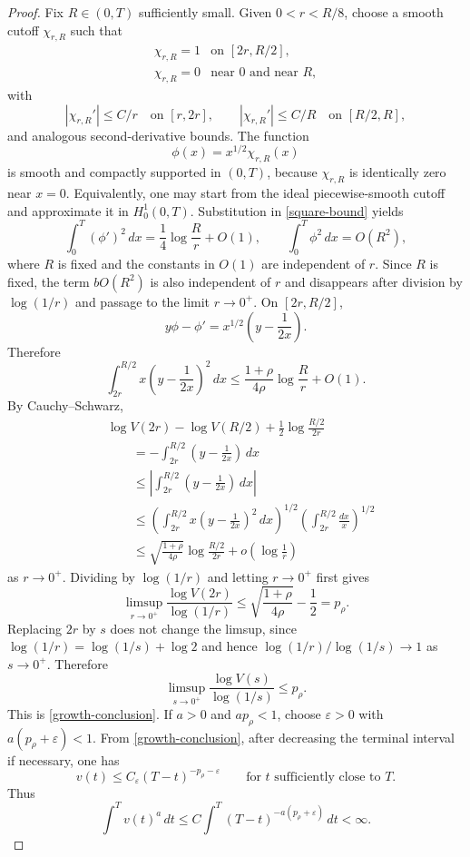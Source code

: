 \documentclass[11pt]{amsart}
\numberwithin{equation}{section}
\begin{document}
\begin{proof}
Fix $R\in(0,T)$ sufficiently small.  Given $0<r<R/8$, choose a smooth cutoff $\chi_{r,R}$ such that
$$
\begin{array}{ll}
        \chi_{r,R}=1 &\text{on }[2r,R/2],\\
        \chi_{r,R}=0 &\text{near }0\text{ and near }R,
\end{array}
$$
with
$$
        |\chi_{r,R}'|\leq C/r\quad\text{on }[r,2r],
        \qquad
        |\chi_{r,R}'|\leq C/R\quad\text{on }[R/2,R],
$$
and analogous second-derivative bounds.  The function
$$
        \phi(x)=x^{1/2}\chi_{r,R}(x)
$$
is smooth and compactly supported in $(0,T)$, because $\chi_{r,R}$ is identically zero near $x=0$.  Equivalently, one may start from the ideal piecewise-smooth cutoff and approximate it in $H_0^1(0,T)$.  Substitution in \eqref{square-bound} yields
$$
        \int_0^T(\phi')^2\,dx
        =\frac14\log\frac{R}{r}+O(1),
        \qquad
        \int_0^T\phi^2\,dx=O(R^2),
$$
where $R$ is fixed and the constants in $O(1)$ are independent of $r$.  Since $R$ is fixed, the term $bO(R^2)$ is also independent of $r$ and disappears after division by $\log(1/r)$ and passage to the limit $r\to0^+$.  On $[2r,R/2]$,
$$
        y\phi-\phi'=x^{1/2}\left(y-\frac1{2x}\right).
$$
Therefore
\begin{equation}\label{central-bound}
        \int_{2r}^{R/2} x\left(y-\frac1{2x}\right)^2\,dx
        \leq
        \frac{1+\rho}{4\rho}\log\frac{R}{r}+O(1).
\end{equation}
By Cauchy--Schwarz,
\begin{align*}
&\log V(2r)-\log V(R/2)+\frac12\log\frac{R/2}{2r} \\
&\qquad
= -\int_{2r}^{R/2}\left(y-\frac1{2x}\right)\,dx \\
&\qquad
\leq
\left|\int_{2r}^{R/2}\left(y-\frac1{2x}\right)\,dx\right| \\
&\qquad
\leq
\left(\int_{2r}^{R/2}x\left(y-\frac1{2x}\right)^2\,dx\right)^{1/2}
\left(\int_{2r}^{R/2}\frac{dx}{x}\right)^{1/2} \\
&\qquad
\leq
\sqrt{\frac{1+\rho}{4\rho}}\log\frac{R/2}{2r}+o\!\left(\log\frac1r\right)
\end{align*}
as $r\to0^+$.  Dividing by $\log(1/r)$ and letting $r\to0^+$ first gives
$$
        \limsup_{r\to0^+}\frac{\log V(2r)}{\log(1/r)}
        \leq
        \sqrt{\frac{1+\rho}{4\rho}}-\frac12
        =p_\rho .
$$
Replacing $2r$ by $s$ does not change the limsup, since
$\log(1/r)=\log(1/s)+\log 2$ and hence
$\log(1/r)/\log(1/s)\to1$ as $s\to0^+$.  Therefore
$$
        \limsup_{s\to0^+}\frac{\log V(s)}{\log(1/s)}
        \leq p_\rho .
$$
This is \eqref{growth-conclusion}.  If $a>0$ and $a p_\rho<1$, choose $\varepsilon>0$ with $a(p_\rho+\varepsilon)<1$.  From \eqref{growth-conclusion}, after decreasing the terminal interval if necessary, one has
$$
        v(t)\leq C_\varepsilon (T-t)^{-p_\rho-\varepsilon}
        \qquad\text{for }t\text{ sufficiently close to }T.
$$
Thus
$$
        \int^T v(t)^a\,dt
        \leq
        C\int^T (T-t)^{-a(p_\rho+\varepsilon)}\,dt<\infty .
$$
\end{proof}
\end{document}
